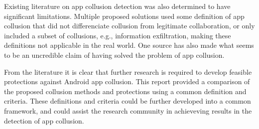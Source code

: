 \documentclass[article]{aaltoseries}
\begin{document}
Existing literature on app collusion detection was also determined to have significant limitations. Multiple proposed solutions used some definition of app collusion that did not differenciate collusion from legitimate collaboration, or only included a subset of collusions, e.g., information exfiltration, making these definitions not applicable in the real world. One source has also made what seems to be an uncredible claim of having solved the problem of app collusion. 

From the literature it is clear that further research is required to develop feasible protections against Android app collusion. This report provided a comparison of the proposed collusion methods and protections using a common definition and criteria. These definitions and criteria could be further developed into a common framework, and could assist the research community in achieveving results in the detection of app collusion.




\end{document}
